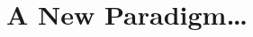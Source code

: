 \documentclass[11pt, openany, oneside]{Latex/Classes/PhDthesisPSnPDF}
\begin{document}
		
			
\part{A New Paradigm\ldots}

  


\begin{partChapter}

\end{partChapter}


\backmatter


 

\clearpage
\begin{partChapter}
\begin{multicols}{2} %
\begin{footnotesize} %

\printnomenclature[1.5cm] %
\label{nom} %

\end{footnotesize}
\end{multicols}
\end{partChapter}



\end{document}
